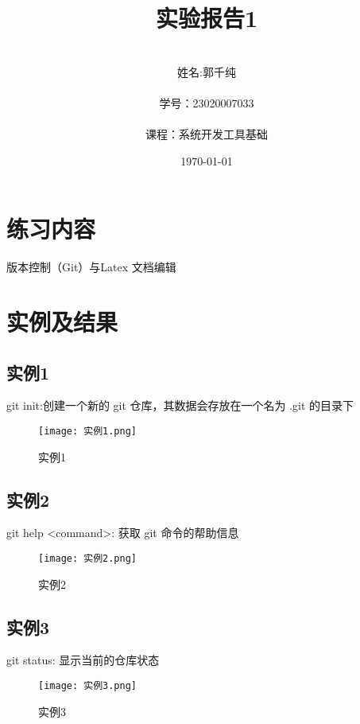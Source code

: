 \documentclass[a4paper, 12pt]{article}
\begin{document}
  \title{实验报告1}
  \author{\\姓名:郭千纯\\
		\\学号：23020007033\\
		\\课程：系统开发工具基础\\}
  \date{\today\\}
  \maketitle
{}
\tableofcontents
\newpage
{}
\section{练习内容}
版本控制（Git）与Latex 文档编辑

\section{实例及结果}

\subsection{实例1}
git init:创建一个新的 git 仓库，其数据会存放在一个名为 .git 的目录下

\begin{figure}[h!]
  \centering
  \texttt{[image: 实例1.png]}
  \caption{实例1}
\end{figure}

\subsection{实例2}
git help <command>: 获取 git 命令的帮助信息

\begin{figure}[h!]
  \centering
  \texttt{[image: 实例2.png]}
  \caption{实例2}
\end{figure}

\subsection{实例3}
git status: 显示当前的仓库状态

\begin{figure}[h!]
  \centering
  \texttt{[image: 实例3.png]}
  \caption{实例3}
\end{figure}
\end{document}
